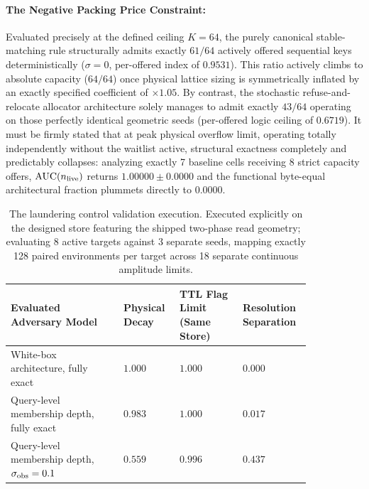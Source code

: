 \documentclass{article}
\begin{document}
\paragraph{The Negative Packing Price Constraint:} Evaluated precisely at the defined ceiling $K=64$, the purely canonical stable-matching rule structurally admits exactly $61/64$ actively offered sequential keys deterministically ($\sigma=0$, per-offered index of $0.9531$). This ratio actively climbs to absolute capacity ($64/64$) once physical lattice sizing is symmetrically inflated by an exactly specified coefficient of $\times1.05$. By contrast, the stochastic refuse-and-relocate allocator architecture solely manages to admit exactly $43/64$ operating on those perfectly identical geometric seeds (per-offered logic ceiling of $0.6719$). It must be firmly stated that at peak physical overflow limit, operating totally independently without the waitlist active, structural exactness completely and predictably collapses: analyzing exactly 7 baseline cells receiving 8 strict capacity offers, $\mathrm{AUC}(n_{\rm live})$ returns $1.00000\pm0.0000$ and the functional byte-equal architectural fraction plummets directly to $0.0000$.

\begin{table}[!htb]\centering\small
\caption{The laundering control validation execution. Executed explicitly on the designed store featuring the shipped two-phase read geometry; evaluating 8 active targets against 3 separate seeds, mapping exactly 128 paired environments per target across 18 separate continuous amplitude limits.}
\begin{tabular}{p{0.34\linewidth}p{0.15\linewidth}p{0.19\linewidth}p{0.16\linewidth}}
\toprule
Evaluated Adversary Model & Physical Decay & TTL Flag Limit (Same Store) & Resolution Separation\\
\midrule
White-box architecture, fully exact & $1.000$ & $1.000$ & $0.000$\\
Query-level membership depth, fully exact & $0.983$ & $1.000$ & $0.017$\\
Query-level membership depth, $\sigma_{\rm obs}=0.1$ & $0.559$ & $0.996$ & $0.437$\\
\bottomrule
\end{tabular}
\end{table}
\end{document}
